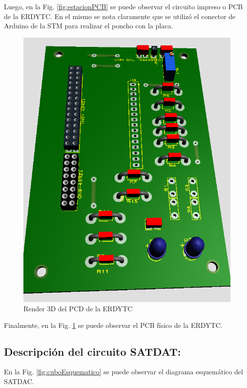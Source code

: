 \documentclass[conference]{IEEEtran}
\begin{document}
Luego, en la Fig. \ref{fig:estacionPCB} se puede observar el circuito impreso o PCB de la ERDYTC. En el mismo se nota claramente que se utilizó el conector de Arduino de la STM para realizar el poncho con la placa.

\begin{figure}[htbp]
\centering
\includegraphics[width=.9\linewidth]{../../images/estacion3D.png}
\caption{\label{fig:estacion3D}Render 3D del PCD de la ERDYTC}
\end{figure}

Finalmente, en la Fig. \ref{fig:estacion3D} se puede observar el PCB físico de la ERDYTC.
\subsection{Descripción del circuito SATDAT:}
\label{sec:orgba347ec}
En la Fig. \ref{fig:cuboEsquematico} se puede observar el diagrama esquemático del SATDAC.
\end{document}
